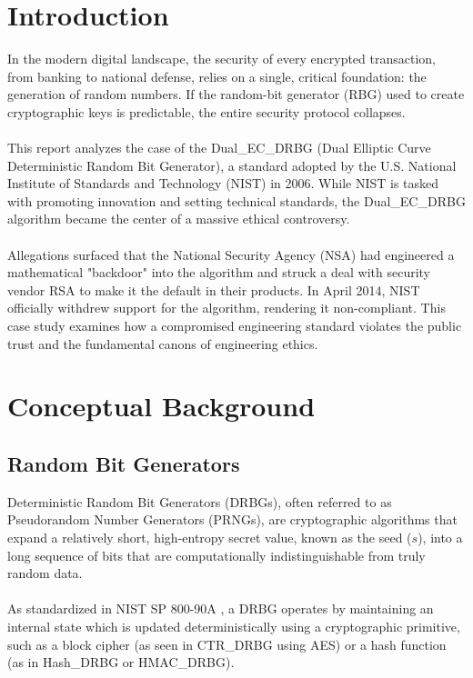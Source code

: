 \documentclass[12pt,letterpaper]{article}
\begin{document}



\tableofcontents
\newpage

\section{Introduction}

In the modern digital landscape, the security of every encrypted transaction, from banking to national defense, relies on a single, critical foundation: the generation of random numbers.   If the random-bit generator (RBG) used to create cryptographic keys is predictable, the entire security protocol collapses. \\ \\This report analyzes the case of the Dual\_EC\_DRBG (Dual Elliptic Curve Deterministic Random Bit Generator), a standard adopted by the U.S. National Institute of Standards and Technology (NIST) in 2006. While NIST is tasked with promoting innovation and setting technical standards, the Dual\_EC\_DRBG algorithm became the center of a massive ethical controversy. \\ \\ Allegations surfaced that the National Security Agency (NSA) had engineered a mathematical "backdoor" into the algorithm and struck a deal with security vendor RSA to make it the default in their products. In April 2014, NIST officially withdrew support for the algorithm, rendering it non-compliant. This case study examines how a compromised engineering standard violates the public trust and the fundamental canons of engineering ethics.

\section{Conceptual Background}
\subsection{Random Bit Generators}
Deterministic Random Bit Generators (DRBGs), often referred to as Pseudorandom Number Generators (PRNGs), are cryptographic algorithms that expand a relatively short, high-entropy secret value, known as the seed ($s$), into a long sequence of bits that are computationally indistinguishable from truly random data.
\\ \\
As standardized in NIST SP 800-90A \cite{Barker2015}, a DRBG operates by maintaining an internal state which is updated deterministically using a cryptographic primitive, such as a block cipher (as seen in CTR\_DRBG using AES) or a hash function (as in Hash\_DRBG or HMAC\_DRBG).
\end{document}
